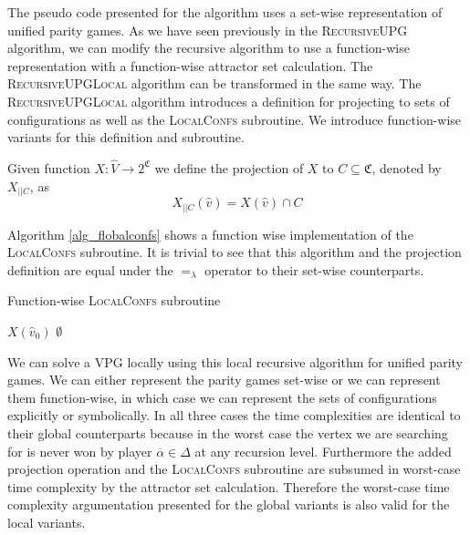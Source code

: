 The pseudo code presented for the algorithm uses a set-wise representation of unified parity games. As we have seen previously in the \textsc{RecursiveUPG} algorithm, we can modify the recursive algorithm to use a function-wise representation with a function-wise attractor set calculation. The \textsc{RecursiveUPGLocal} algorithm can be transformed in the same way. The \textsc{RecursiveUPGLocal} algorithm introduces a definition for projecting to sets of configurations as well as the \textsc{LocalConfs} subroutine. We introduce function-wise variants for this definition and subroutine.
\begin{definition}
	Given function $X : \hat{V} \rightarrow 2^\mathfrak{C}$ we define the projection of $X$ to $C \subseteq \mathfrak{C}$, denoted by $X_{||C}$, as
	\[ X_{||C}(\hat{v}) = X(\hat{v}) \cap C \]
\end{definition}
Algorithm \ref{alg_flobalconfs} shows a function wise implementation of the \textsc{LocalConfs} subroutine. It is trivial to see that this algorithm and the projection definition are equal under the $=_\lambda$ operator to their set-wise counterparts.
\begin{algorithm}
	\caption{Function-wise \textsc{LocalConfs} subroutine}
	\label{alg_flobalconfs}
	\begin{algorithmic}[1]
		\If{$\overline{\alpha} \in \Delta$}
		\State \Return $X(\hat{v}_0)$
		\Else
		\State \Return $\emptyset$
		\EndIf
		\EndFunction
	\end{algorithmic}
\end{algorithm}

We can solve a VPG locally using this local recursive algorithm for unified parity games. We can either represent the parity games set-wise or we can represent them function-wise, in which case we can represent the sets of configurations explicitly or symbolically. In all three cases the time complexities are identical to their global counterparts because in the worst case the vertex we are searching for is never won by player $\overline{\alpha} \in \Delta$ at any recursion level. Furthermore the added projection operation and the \textsc{LocalConfs} subroutine are subsumed in worst-case time complexity by the attractor set calculation. Therefore the worst-case time complexity argumentation presented for the global variants is also valid for the local variants. 